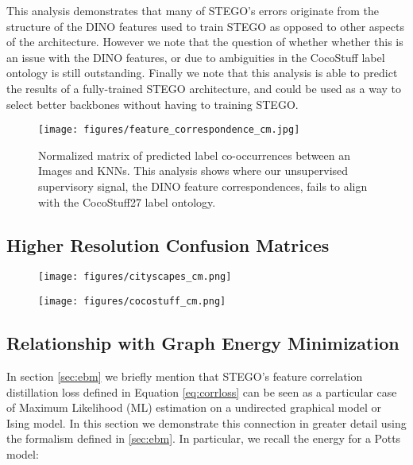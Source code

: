 \documentclass{article} \usepackage{iclr2022_conference,times}
\begin{document}
This analysis demonstrates that many of STEGO's errors originate from the structure of the DINO features used to train STEGO as opposed to other aspects of the architecture. However we note that the question of whether whether this is an issue with the DINO features, or due to ambiguities in the CocoStuff label ontology is still outstanding. Finally we note that this analysis is able to predict the results of a fully-trained STEGO architecture, and could be used as a way to select better backbones without having to training STEGO.

 \begin{figure}[h]
 \centering
 \texttt{[image: figures/feature\_correspondence\_cm.jpg]}
  \caption{Normalized matrix of predicted label co-occurrences between an Images and KNNs. This analysis shows where our unsupervised supervisory signal, the DINO feature correspondences, fails to align with the CocoStuff27 label ontology.} 
\label{fig:feature_correspondence_cm}
\end{figure}

\newpage

\subsection{Higher Resolution Confusion Matrices}
 \label{sec:high-res-cm}

\begin{figure}[h]
\centering
  \texttt{[image: figures/cityscapes\_cm.png]}
  \label{fig:cityscapes_cm}
\end{figure}

\begin{figure}[h]
\centering
  \texttt{[image: figures/cocostuff\_cm.png]}
  \label{fig:cocostuff_cm_2}
\end{figure}

\newpage

\subsection{Relationship with Graph Energy Minimization}
\label{sec:additional_ebm}

In section \ref{sec:ebm} we briefly mention that STEGO's feature correlation distillation loss defined in Equation \ref{eq:corrloss} can be seen as a particular case of Maximum Likelihood (ML) estimation on a undirected graphical model or Ising model. In this section we demonstrate this connection in greater detail using the formalism defined in \ref{sec:ebm}. In particular, we recall the energy for a Potts model:
\end{document}
